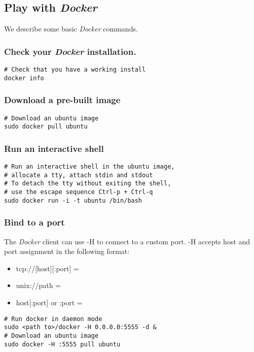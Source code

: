 \documentclass[11pt]{article}
\begin{document}
\subsection{Play with \emph{Docker}}
\label{sec-2-3}

We describe some basic \emph{Docker} commands.
\subsubsection{Check your \emph{Docker} installation.}
\label{sec-2-3-1}


\begin{verbatim}
# Check that you have a working install
docker info
\end{verbatim}
\subsubsection{Download a pre-built image}
\label{sec-2-3-2}


\begin{verbatim}
# Download an ubuntu image
sudo docker pull ubuntu
\end{verbatim}
\subsubsection{Run an interactive shell}
\label{sec-2-3-3}


\begin{verbatim}
# Run an interactive shell in the ubuntu image,
# allocate a tty, attach stdin and stdout
# To detach the tty without exiting the shell,
# use the escape sequence Ctrl-p + Ctrl-q
sudo docker run -i -t ubuntu /bin/bash
\end{verbatim}
\subsubsection{Bind to a port}
\label{sec-2-3-4}

The \emph{Docker} client can use -H to connect to a custom port.
-H accepts host and port assignment in the following format: 
\begin{itemize}
\item tcp://[host][:port]  =
\item unix://path =
\item host[:port] or :port =
\end{itemize}


\begin{verbatim}
# Run docker in daemon mode
sudo <path to>/docker -H 0.0.0.0:5555 -d &
# Download an ubuntu image
sudo docker -H :5555 pull ubuntu
\end{verbatim}
\end{document}
